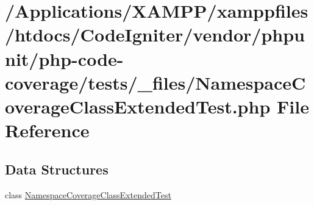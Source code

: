 \hypertarget{php-code-coverage_2tests_2__files_2_namespace_coverage_class_extended_test_8php}{}\section{/\+Applications/\+X\+A\+M\+P\+P/xamppfiles/htdocs/\+Code\+Igniter/vendor/phpunit/php-\/code-\/coverage/tests/\+\_\+files/\+Namespace\+Coverage\+Class\+Extended\+Test.php File Reference}
\label{php-code-coverage_2tests_2__files_2_namespace_coverage_class_extended_test_8php}
\subsection*{Data Structures}
\begin{DoxyCompactItemize}
\item 
class \mbox{\hyperlink{class_namespace_coverage_class_extended_test}{Namespace\+Coverage\+Class\+Extended\+Test}}
\end{DoxyCompactItemize}
